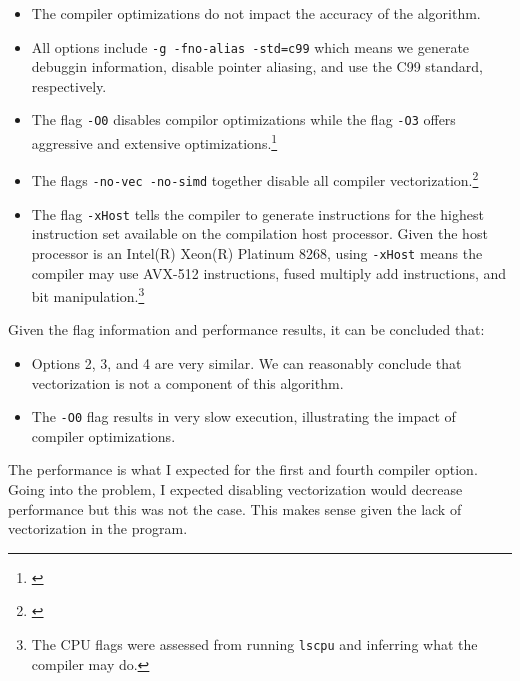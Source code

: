 \documentclass{article}
\newcommand{\MYhref}[3][blue]{\href{#2}{\color{#1}{#3}}}%
\begin{document}
\begin{itemize}
    \item The compiler optimizations do not impact the accuracy of the algorithm.
    \item All options include \texttt{-g -fno-alias -std=c99} which means we generate 
    debuggin information, disable pointer aliasing, and use the C99 standard, respectively.
    \item The flag \texttt{-O0} disables compilor optimizations while the flag \texttt{-O3} offers aggressive and extensive optimizations.\footnote{\MYhref{https://www.intel.com/content/www/us/en/docs/cpp-compiler/developer-guide-reference/2021-8/o-001.html}{Optimizations Compiler Documentation.}}
    \item The flags \texttt{-no-vec -no-simd} together disable all compiler vectorization.\footnote{\MYhref{https://www.intel.com/content/www/us/en/docs/cpp-compiler/developer-guide-reference/2021-8/simd-qsimd.html}{SIMD Compiler Documentation.}}
    \item The flag \texttt{-xHost} tells the compiler to generate instructions for the highest instruction set available on the compilation host processor. Given the host processor is an Intel(R) Xeon(R) Platinum 8268, using \texttt{-xHost} 
    means the compiler may use AVX-512 instructions, fused multiply add instructions, and bit manipulation.\footnote{\MYhref{https://www.intel.com/content/www/us/en/docs/cpp-compiler/developer-guide-reference/2021-8/xhost-qxhost.html}{xHost Compiler Documentation.} The CPU flags were assessed from running \texttt{lscpu} and inferring what the compiler may do.}
\end{itemize}
Given the flag information and performance results, it can be concluded that:
\begin{itemize}
    \item Options 2, 3, and 4 are very similar. We can reasonably conclude that vectorization is not a component of this algorithm. 
    \item The \texttt{-O0} flag results in very slow execution, illustrating the impact of compiler optimizations.
\end{itemize}
The performance is what I expected for the first and fourth compiler option. Going into the problem, I expected disabling vectorization 
would decrease performance but this was not the case. This makes sense given the lack of vectorization in the program.
\end{document}
